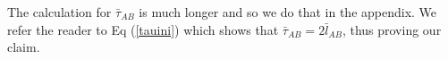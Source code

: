 \documentclass[aps,showpacs,onecolumn,floats,prd,superscriptaddress,nofootinbib]{revtex4-1}
\begin{document}
The calculation for $\bar{\tau}_{AB}$ is much longer and so we do that in the appendix. We refer the reader to Eq (\ref{tauini}) which shows that $\bar{\tau}_{AB} = 2 \bar{l}_{AB}$, thus proving our claim.  

%
%
%
%
%
\end{document}
